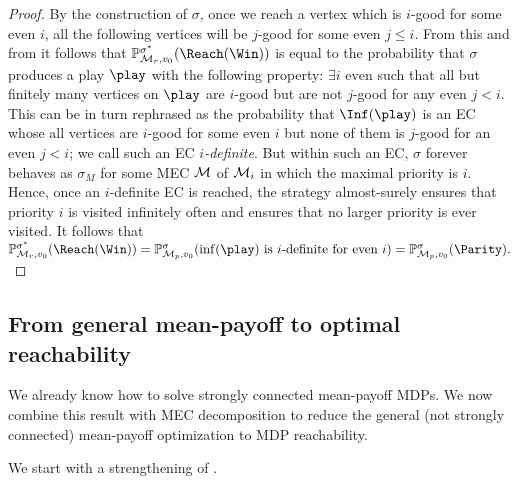 \begin{proof}
By the construction of $\sigma$, once we reach a vertex which is $i$-good for some even $i$, all the following vertices will be $j$-good for some even $j\leq i$. From this and from  it follows that $\probm^{\sigma^*}_{\mdp_r,\vinit}(\Reach(\Win))$ is equal to the probability that $\sigma$ produces a play $\play$ with the following property: $\exists i \text{ even}$ such that all but finitely many vertices on $\play$ are $i$-good but are not $j$-good for any even $j<i$. This can be in turn rephrased as the probability that $\Inf(\play)$ is an EC whose all vertices are $i$-good for some even $i$ but none of them is $j$-good for an even $j<i$; we call such an EC \emph{$i$-definite}. But within such an EC, $\sigma$ forever behaves as $\sigma_M$ for some MEC $\mathcal{M}$ of $\mathcal{M}_i$ in which the maximal priority is $i$. Hence, once an $i$-definite EC is reached, the strategy almost-surely ensures that priority $i$ is visited infinitely often and ensures that no larger priority is ever visited. It follows that  $\probm^{\sigma^*}_{\mdp_r,\vinit}(\Reach(\Win)) = \probm^{\sigma}_{\mdp_p,\vinit}(\inf(\play) \text{ is $i$-definite for even }i ) = \probm^{\sigma}_{\mdp_p,\vinit}(\Parity).$
\end{proof}

\subsection*{From general mean-payoff to optimal reachability}

We already know how to solve strongly connected mean-payoff MDPs. We now combine this result with MEC decomposition to reduce the general (not strongly connected) mean-payoff optimization to MDP reachability.

We start with a strengthening of .

